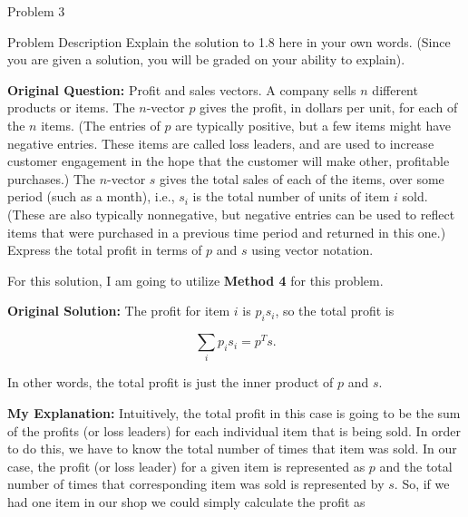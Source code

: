 \begin{problem}{Problem 3}
    \begin{statement}{Problem Description}
        Explain the solution to 1.8 here in your own words. (Since you are given a solution, you will be graded on your ability to explain). \vspace*{1em}

        \textbf{Original Question:} Profit and sales vectors. A company sells $n$ different products or items. The $n$-vector $p$ gives the profit, in dollars per unit, for each of the $n$ items. (The entries 
        of $p$ are typically positive, but a few items might have negative entries. These items are called loss leaders, and are used to increase customer engagement in the hope that the customer will make other, 
        profitable purchases.) The $n$-vector $s$ gives the total sales of each of the items, over some period (such as a month), i.e., $s_{i}$ is the total number of units of item $i$ sold. (These are also typically 
        nonnegative, but negative entries can be used to reflect items that were purchased in a previous time period and returned in this one.) Express the total profit in terms of $p$ and $s$ using vector notation.
    \end{statement}

    \begin{highlight}[Solution]
        For this solution, I am going to utilize \textbf{Method 4} for this problem. \vspace*{1em}

        \textbf{Original Solution:} The profit for item $i$ is $p_{i}s_{i}$, so the total profit is

        \setcounter{equation}{0}
        \begin{equation}
            \sum_{i} p_{i}s_{i} = p^{T}s.
        \end{equation}

        In other words, the total profit is just the inner product of $p$ and $s$. \vspace*{1em}

        \textbf{My Explanation:} Intuitively, the total profit in this case is going to be the sum of the profits (or loss leaders) for each individual item that is being sold. In order to do this, we have to know 
        the total number of times that item was sold. In our case, the profit (or loss leader) for a given item is represented as $p$ and the total number of times that corresponding item was sold is represented by
        $s$. So, if we had one item in our shop we could simply calculate the profit as


\end{highlight}
\end{problem}
